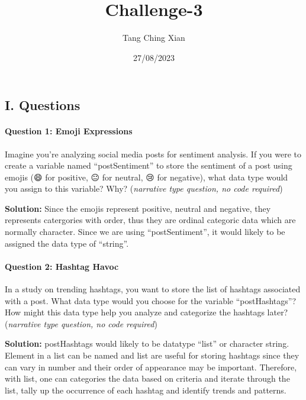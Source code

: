 \documentclass[
]{article}
\title{Challenge-3}
\author{Tang Ching Xian}
\date{27/08/2023}
\begin{document}
\maketitle

\hypertarget{i.-questions}{%
\subsection{I. Questions}\label{i.-questions}}

\hypertarget{question-1-emoji-expressions}{%
\paragraph{Question 1: Emoji
Expressions}\label{question-1-emoji-expressions}}

Imagine you're analyzing social media posts for sentiment analysis. If
you were to create a variable named ``postSentiment'' to store the
sentiment of a post using emojis (😄 for positive, 😐 for neutral, 😢
for negative), what data type would you assign to this variable? Why?
(\emph{narrative type question, no code required})

\textbf{Solution:} Since the emojis represent positive, neutral and
negative, they represents catergories with order, thus they are ordinal
categoric data which are normally character. Since we are using
``postSentiment'', it would likely to be assigned the data type of
``string''.

\hypertarget{question-2-hashtag-havoc}{%
\paragraph{Question 2: Hashtag Havoc}\label{question-2-hashtag-havoc}}

In a study on trending hashtags, you want to store the list of hashtags
associated with a post. What data type would you choose for the variable
``postHashtags''? How might this data type help you analyze and
categorize the hashtags later? (\emph{narrative type question, no code
required})

\textbf{Solution:} postHashtags would likely to be datatype ``list'' or
character string. Element in a list can be named and list are useful for
storing hashtags since they can vary in number and their order of
appearance may be important. Therefore, with list, one can categories
the data based on criteria and iterate through the list, tally up the
occurrence of each hashtag and identify trends and patterns.
\end{document}
